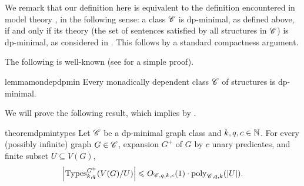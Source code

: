 We remark that our definition here is equivalent to the definition encountered in model theory \cite{DolichGoodrickLippel2011}, in the following sense: a class $\mathscr C$ is dp-minimal, as defined above, if and only if its theory (the set of sentences satisfied by all structures in $\mathscr C$) is dp-minimal, as considered in \cite{DolichGoodrickLippel2011}. This follows by a standard compactness argument.

The following is well-known (see  for a simple proof).
\begin{restatable}{lemma}{mondepdpmin}\label{lem:mondep-dpmin}
    Every monadically dependent class $\mathscr C$ of structures is dp-minimal.
\end{restatable}


We will prove the following result, which implies  by .
{\typeboundgeneraltrue
\begin{restatable}{theorem}{dpmintypes}\label{thm:type-bound-dp}
Let $\mathscr C$ be a dp-minimal graph class and $k,q,c\in\mathbb N$.
For every \iftypeboundgeneral(possibly infinite) \fi graph $G \in \mathscr C$, expansion $G^+$ of $G$ by $c$ unary predicates, and \iftypeboundgeneral finite \fi subset $U \subseteq V(G)$,
\begin{align*}\label{eq:type-bound-dp}
    \left|\operatorname{Types}^{G^+}_{k,q}(V(G)/U)\right| \leqslant O_{\mathscr C,q,k,c}(1)\cdot \mathrm{poly}_{\mathscr C,q,k}(|U|).
\end{align*}
\end{restatable}
}


